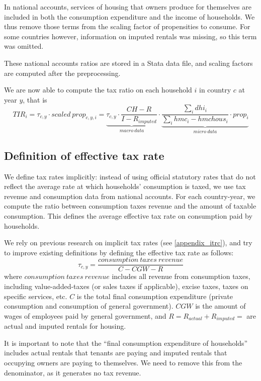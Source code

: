 In national accounts, services of housing that owners produce for themselves are included in both the consumption expenditure and the income of households. We thus remove those terms from the scaling factor of propensities to consume. For some countries however, information on imputed rentals was missing, so this term was omitted.

These national accounts ratios are stored in a Stata data file, and scaling factors are computed after the preprocessing.

We are now able to compute the tax ratio on each household $i$ in country $c$ at year $y$, that is
\[ TIR_i = \tau_{c,y} \cdot scaled\ prop_{c,y,i} = \underbrace{\tau_{c,y} \cdot \frac{CH-R}{I-R_{imputed}}}_{macro\ data} \cdot \underbrace{\frac{\sum_i dhi_i}{\sum_i hmc_i-hmchous_i } \cdot prop_i}_{micro\ data}  \]

\subsection{Definition of effective tax rate}

We define tax rates implicitly: instead of using official statutory rates that do not reflect the average rate at which households' consumption is taxed, we use tax revenue and consumption data from national accounts. For each country-year, we compute the ratio between consumption taxes revenue and the amount of taxable consumption. This defines the average effective tax rate on consumption paid by households.

We rely on previous research on implicit tax rates (see \cref{appendix_itrc}), and try to improve existing definitions by defining the effective tax rate as follows:
\[ \tau_{c,y} = \frac{consumption\ taxes\ revenue}{C - CGW - R} \]
where $consumption\ taxes\ revenue$ includes all revenue from consumption taxes, including value-added-taxes (or sales taxes if applicable), excise taxes, taxes on specific services, etc. $C$ is the total final consumption expenditure (private consumption and consumption of general government). $CGW$ is the amount of wages of employees paid by general government, and $R = R_{actual} + R_{imputed} =$ are actual and imputed rentals for housing.

It is important to note that the ``final consumption expenditure of households'' includes actual rentals that tenants are paying and imputed rentals that occupying owners are paying to themselves. We need to remove this from the denominator, as it generates no tax revenue.

